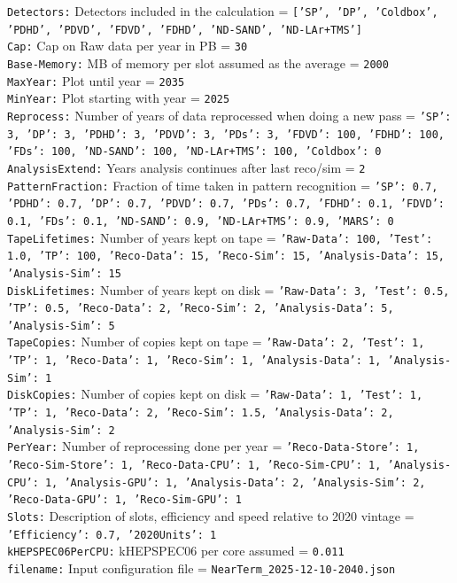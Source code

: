 {\tt Detectors:} Detectors included in the calculation = {\tt ['SP', 'DP', 'Coldbox', 'PDHD', 'PDVD', 'FDVD', 'FDHD', 'ND-SAND', 'ND-LAr+TMS']} \\
{\tt Cap:} Cap on Raw data per year in PB = {\tt 30} \\
{\tt Base-Memory:} MB of memory per slot assumed as the average = {\tt 2000} \\
{\tt MaxYear:} Plot until year = {\tt 2035} \\
{\tt MinYear:} Plot starting with year = {\tt 2025} \\
{\tt Reprocess:} Number of years of data reprocessed when doing a new pass = {\tt {'SP': 3, 'DP': 3, 'PDHD': 3, 'PDVD': 3, 'PDs': 3, 'FDVD': 100, 'FDHD': 100, 'FDs': 100, 'ND-SAND': 100, 'ND-LAr+TMS': 100, 'Coldbox': 0}} \\
{\tt AnalysisExtend:} Years analysis continues after last reco/sim = {\tt 2} \\
{\tt PatternFraction:} Fraction of time taken in pattern recognition = {\tt {'SP': 0.7, 'PDHD': 0.7, 'DP': 0.7, 'PDVD': 0.7, 'PDs': 0.7, 'FDHD': 0.1, 'FDVD': 0.1, 'FDs': 0.1, 'ND-SAND': 0.9, 'ND-LAr+TMS': 0.9, 'MARS': 0}} \\
{\tt TapeLifetimes:} Number of years kept on tape = {\tt {'Raw-Data': 100, 'Test': 1.0, 'TP': 100, 'Reco-Data': 15, 'Reco-Sim': 15, 'Analysis-Data': 15, 'Analysis-Sim': 15}} \\
{\tt DiskLifetimes:} Number of years kept on disk = {\tt {'Raw-Data': 3, 'Test': 0.5, 'TP': 0.5, 'Reco-Data': 2, 'Reco-Sim': 2, 'Analysis-Data': 5, 'Analysis-Sim': 5}} \\
{\tt TapeCopies:} Number of copies kept on tape = {\tt {'Raw-Data': 2, 'Test': 1, 'TP': 1, 'Reco-Data': 1, 'Reco-Sim': 1, 'Analysis-Data': 1, 'Analysis-Sim': 1}} \\
{\tt DiskCopies:} Number of copies kept on disk = {\tt {'Raw-Data': 1, 'Test': 1, 'TP': 1, 'Reco-Data': 2, 'Reco-Sim': 1.5, 'Analysis-Data': 2, 'Analysis-Sim': 2}} \\
{\tt PerYear:} Number of reprocessing done per year = {\tt {'Reco-Data-Store': 1, 'Reco-Sim-Store': 1, 'Reco-Data-CPU': 1, 'Reco-Sim-CPU': 1, 'Analysis-CPU': 1, 'Analysis-GPU': 1, 'Analysis-Data': 2, 'Analysis-Sim': 2, 'Reco-Data-GPU': 1, 'Reco-Sim-GPU': 1}} \\
{\tt Slots:} Description of slots, efficiency and speed relative to 2020 vintage = {\tt {'Efficiency': 0.7, '2020Units': 1}} \\
{\tt kHEPSPEC06PerCPU:} kHEPSPEC06 per core assumed = {\tt 0.011} \\
{\tt filename:} Input configuration file = {\tt NearTerm\_2025-12-10-2040.json} \\
